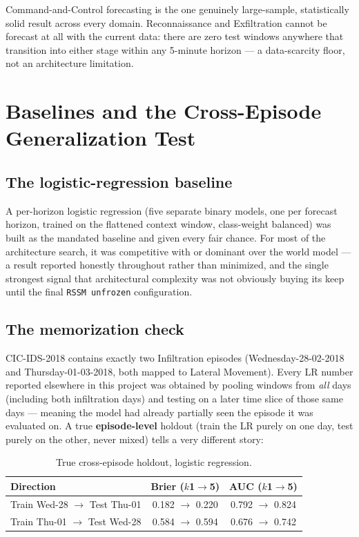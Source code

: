 \documentclass[11pt]{article}
\newcommand{\bad}{\textcolor{red!55!black}}
\newcommand{\code}[1]{\texttt{#1}}
\begin{document}
Command-and-Control forecasting is the one genuinely large-sample, statistically solid result
across every domain. Reconnaissance and Exfiltration cannot be forecast at all with the current
data: there are zero test windows anywhere that transition into either stage within any 5-minute
horizon --- a data-scarcity floor, not an architecture limitation.

\section{Baselines and the Cross-Episode Generalization Test}\label{sec:crossepisode}

\subsection{The logistic-regression baseline}

A per-horizon logistic regression (five separate binary models, one per forecast horizon,
trained on the flattened context window, class-weight balanced) was built as the mandated
baseline and given every fair chance. For most of the architecture search, it was competitive
with or dominant over the world model --- a result reported honestly throughout rather than
minimized, and the single strongest signal that architectural complexity was not obviously
buying its keep until the final \code{RSSM unfrozen} configuration.

\subsection{The memorization check}

CIC-IDS-2018 contains exactly two Infiltration episodes (Wednesday-28-02-2018 and
Thursday-01-03-2018, both mapped to Lateral Movement). Every LR number reported elsewhere in
this project was obtained by pooling windows from \emph{all} days (including both infiltration
days) and testing on a later time slice of those same days --- meaning the model had already
partially seen the episode it was evaluated on. A true \textbf{episode-level} holdout (train the
LR purely on one day, test purely on the other, never mixed) tells a very different story:

\begin{table}[htbp]
\centering
\caption{True cross-episode holdout, logistic regression.}
\small
\begin{tabular}{lcc}
\toprule
\textbf{Direction} & \textbf{Brier ($k$1$\to$5)} & \textbf{AUC ($k$1$\to$5)} \\
\midrule
Train Wed-28 \(\to\) Test Thu-01 & 0.182 $\to$ 0.220 & 0.792 $\to$ 0.824 \\
Train Thu-01 \(\to\) Test Wed-28 & \bad{0.584 $\to$ 0.594} & 0.676 $\to$ 0.742 \\
\bottomrule
\end{tabular}
\end{table}
\end{document}
